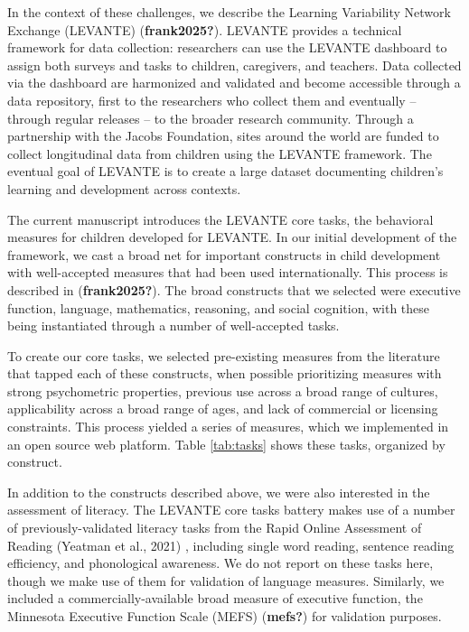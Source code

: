 \documentclass[
  english,
  man]{apa6}
\begin{document}
In the context of these challenges, we describe the Learning Variability Network Exchange (LEVANTE) (\textbf{frank2025?}). LEVANTE provides a technical framework for data collection: researchers can use the LEVANTE dashboard to assign both surveys and tasks to children, caregivers, and teachers. Data collected via the dashboard are harmonized and validated and become accessible through a data repository, first to the researchers who collect them and eventually -- through regular releases -- to the broader research community. Through a partnership with the Jacobs Foundation, sites around the world are funded to collect longitudinal data from children using the LEVANTE framework. The eventual goal of LEVANTE is to create a large dataset documenting children's learning and development across contexts.

The current manuscript introduces the LEVANTE core tasks, the behavioral measures for children developed for LEVANTE. In our initial development of the framework, we cast a broad net for important constructs in child development with well-accepted measures that had been used internationally. This process is described in (\textbf{frank2025?}). The broad constructs that we selected were executive function, language, mathematics, reasoning, and social cognition, with these being instantiated through a number of well-accepted tasks.

To create our core tasks, we selected pre-existing measures from the literature that tapped each of these constructs, when possible prioritizing measures with strong psychometric properties, previous use across a broad range of cultures, applicability across a broad range of ages, and lack of commercial or licensing constraints. This process yielded a series of measures, which we implemented in an open source web platform. Table \ref{tab:tasks} shows these tasks, organized by construct.

In addition to the constructs described above, we were also interested in the assessment of literacy. The LEVANTE core tasks battery makes use of a number of previously-validated literacy tasks from the Rapid Online Assessment of Reading (Yeatman et al., 2021) , including single word reading, sentence reading efficiency, and phonological awareness. We do not report on these tasks here, though we make use of them for validation of language measures. Similarly, we included a commercially-available broad measure of executive function, the Minnesota Executive Function Scale (MEFS) (\textbf{mefs?}) for validation purposes.
\end{document}
